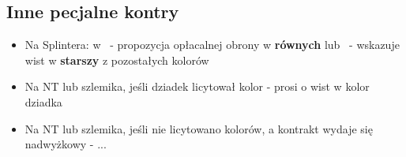 \documentclass[12pt, a4paper]{article}
\begin{document}
\subsection{Inne pecjalne kontry}
\begin{itemize}
    \item Na Splintera:
    \subitem w \ - propozycja opłacalnej obrony
    \subitem w \textbf{równych} lub \ - wskazuje wist w \textbf{starszy} z pozostałych kolorów
    \item Na NT lub szlemika, jeśli dziadek licytował kolor - prosi o wist w kolor dziadka
    \item Na NT lub szlemika, jeśli nie licytowano kolorów, a kontrakt wydaje się nadwyżkowy - ...
      
\end{itemize}
\end{document}
